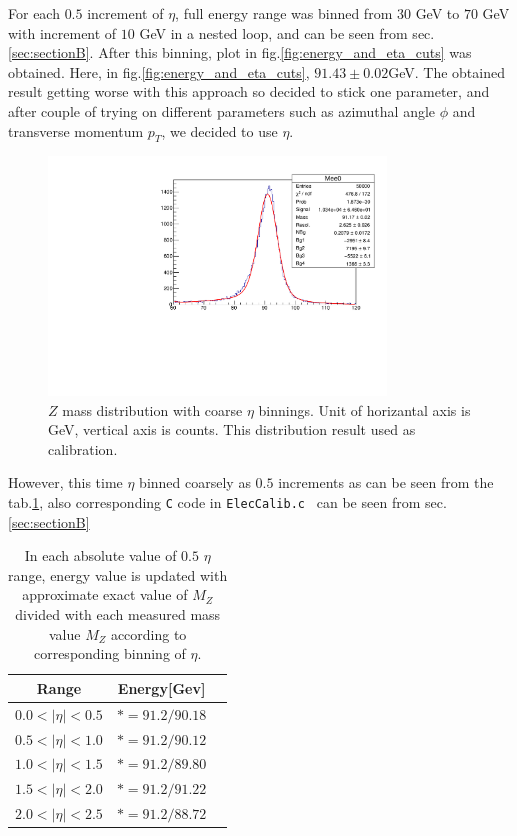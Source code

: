 For each $0.5$ increment of $\eta$, full energy range was binned from $30$ GeV to $70$ GeV with increment of $10$ GeV in a nested loop, and can be seen from sec.\ref{sec:sectionB}. After this binning, plot in fig.\ref{fig:energy_and_eta_cuts} was obtained. Here, in fig.\ref{fig:energy_and_eta_cuts}, $ 91.43 \pm 0.02$GeV. The obtained result getting worse with this approach so decided to stick one parameter, and after couple of trying on different parameters such as azimuthal angle $\phi$ and transverse momentum $p_T$, we decided to use $\eta$.
\begin{figure}[h]
    \centering
	\includegraphics[width=0.8\textwidth]{../figures/course_eta_cuts.pdf}
	\caption{$Z$ mass distribution with coarse $\eta$ binnings. Unit of horizantal axis is GeV, vertical axis is counts. This distribution result used as calibration.}
    \label{fig:course_eta_cuts}
\end{figure}
\FloatBarrier
However, this time $\eta$ binned coarsely as $0.5$ increments as can be seen from the tab.\ref{tab:coarseETA}, also corresponding \texttt{C} code in \texttt{ElecCalib.c } can be seen from sec.\ref{sec:sectionB}
\begin{table}[h]
		\centering
        \begin{tabular}{ccc}
            \toprule
			Range &  Energy[Gev]   \\
            \midrule
            $ 0.0<|\eta|<0.5 $ & $ *= 91.2/90.18 $ \\
  			\midrule
  			$ 0.5<|\eta|<1.0 $ & $ *= 91.2/90.12 $ \\
  			\midrule
  			$ 1.0<|\eta|<1.5 $ & $ *= 91.2/89.80 $ \\
  			\midrule
  			$ 1.5<|\eta|<2.0 $ & $ *= 91.2/91.22 $  \\
  			\midrule
  			$ 2.0<|\eta|<2.5 $ & $ *= 91.2/88.72 $  \\
			\bottomrule
        \end{tabular}
        \caption{In each absolute value of $0.5$ $\eta$ range, energy value is updated with approximate exact value of $M_Z$ divided with each measured mass value $M_Z$ according to corresponding binning of $\eta$. }
        \label{tab:coarseETA}
    \end{table}
\FloatBarrier

